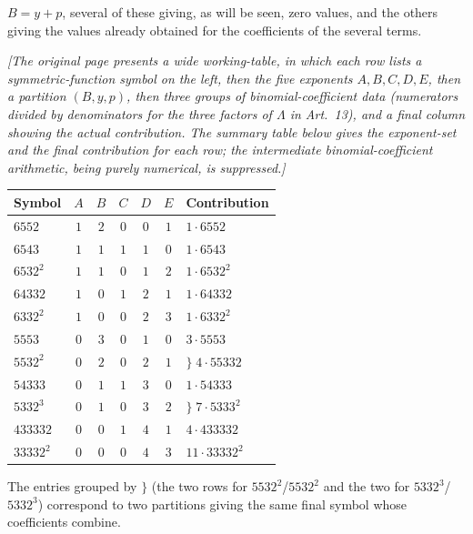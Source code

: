 \documentclass[11pt]{article}
\begin{document}
\noindent $B=y+p$, several of these giving, as will be seen, zero values, and the
others giving the values already obtained for the coefficients of the several terms.

\medskip
\textit{[The original page presents a wide working-table, in which each row lists a
symmetric-function symbol on the left, then the five exponents $A,B,C,D,E$, then a
partition $(B,y,p)$, then three groups of binomial-coefficient data (numerators
divided by denominators for the three factors of $\Lambda$ in Art.~13), and a final
column showing the actual contribution.  The summary table below gives the
exponent-set and the final contribution for each row; the intermediate
binomial-coefficient arithmetic, being purely numerical, is suppressed.]}

\medskip
\begin{center}
\renewcommand{\arraystretch}{1.20}
\begin{tabular}{|l|c|c|c|c|c|l|}
\hline
Symbol & $A$ & $B$ & $C$ & $D$ & $E$ & Contribution \\ \hline
$6552$        & $1$ & $2$ & $0$ & $0$ & $1$ & $1\cdot 6552$ \\ \hline
$6543$        & $1$ & $1$ & $1$ & $1$ & $0$ & $1\cdot 6543$ \\ \hline
$6532^{2}$    & $1$ & $1$ & $0$ & $1$ & $2$ & $1\cdot 6532^{2}$ \\ \hline
$64332$       & $1$ & $0$ & $1$ & $2$ & $1$ & $1\cdot 64332$ \\ \hline
$6332^{2}$    & $1$ & $0$ & $0$ & $2$ & $3$ & $1\cdot 6332^{2}$ \\ \hline
$5553$        & $0$ & $3$ & $0$ & $1$ & $0$ & $3\cdot 5553$ \\ \hline
$5532^{2}$    & $0$ & $2$ & $0$ & $2$ & $1$ & $\bigl\}\;4\cdot 55332$ \\ \hline
$54333$       & $0$ & $1$ & $1$ & $3$ & $0$ & $1\cdot 54333$ \\ \hline
$5332^{3}$    & $0$ & $1$ & $0$ & $3$ & $2$ & $\bigl\}\;7\cdot 5333^{2}$ \\ \hline
$433332$      & $0$ & $0$ & $1$ & $4$ & $1$ & $4\cdot 433332$ \\ \hline
$33332^{2}$   & $0$ & $0$ & $0$ & $4$ & $3$ & $11\cdot 33332^{2}$ \\ \hline
\end{tabular}
\end{center}

\noindent The entries grouped by $\bigl\}$ (the two rows for $5532^{2}$/$5532^{2}$ and
the two for $5332^{3}$/$5332^{3}$) correspond to two partitions giving the same final
symbol whose coefficients combine.
\end{document}
